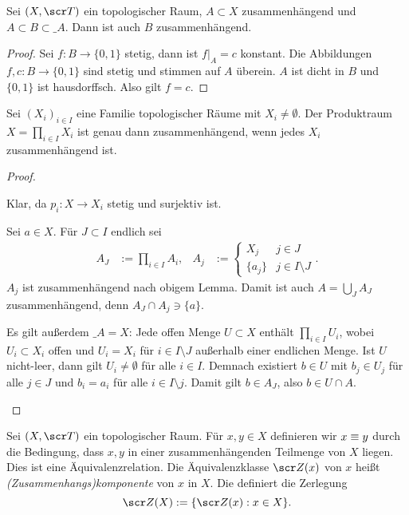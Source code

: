 \begin{lem}
	Sei $(X, \scr T)$ ein topologischer Raum, $A \subset X$ zusammenhängend und $A \subset B \subset \_A$.
	Dann ist auch $B$ zusammenhängend.
	\begin{proof}
		Sei $f: B \to \{0,1\}$ stetig, dann ist $f|_A = c$ konstant.
		Die Abbildungen $f, c: B \to \{0,1\}$ sind stetig und stimmen auf $A$ überein.
		$A$ ist dicht in $B$ und $\{0,1\}$ ist hausdorffsch.
		Also gilt $f=c$.
	\end{proof}
\end{lem}

\begin{st}
	Sei $(X_i)_{i\in I}$ eine Familie topologischer Räume mit $X_i \neq \emptyset$.
	Der Produktraum $X = \prod_{i\in I} X_i$ ist genau dann zusammenhängend, wenn jedes $X_i$ zusammenhängend ist.
	\begin{proof}
		\begin{segnb}[„$\implies$“]
			Klar, da $p_i: X \to X_i$ stetig und surjektiv ist.
		\end{segnb}
		\begin{segnb}[„$\implies$“]
			Sei $a \in X$.
			Für $J \subset I$ endlich sei
			\begin{align*}
				A_J &:= \prod_{i\in I} A_i, &
				A_j &:= \begin{cases}
					X_j & j \in J \\
					\{a_j\} & j \in I \setminus J
				\end{cases}.
			\end{align*}
			$A_j$ ist zusammenhängend nach obigem Lemma.
			Damit ist auch $A = \bigcup_{J} A_J$ zusammenhängend, denn $A_J \cap A_j \ni \{a\}$.

			Es gilt außerdem $\_A = X$:
			Jede offen Menge $U \subset X$ enthält $\prod_{i \in I} U_i$, wobei $U_i \subset X_i$ offen und $U_i = X_i$ für $i \in I \setminus J$ außerhalb einer endlichen Menge.
			Ist $U$ nicht-leer, dann gilt $U_i \neq \emptyset$ für alle $i \in I$.
			Demnach existiert $b \in U$ mit $b_j \in U_j$ für alle $j \in J$ und $b_i = a_i$ für alle $i \in I \setminus j$.
			Damit gilt $b \in A_J$, also $b \in U \cap A$.
		\end{segnb}
	\end{proof}
\end{st}

\begin{df}
	Sei $(X, \scr T)$ ein topologischer Raum.
	Für $x,y \in X$ definieren wir $x \equiv y$ durch die Bedingung, dass $x,y$ in einer zusammenhängenden Teilmenge von $X$ liegen.
	Dies ist eine Äquivalenzrelation.
	Die Äquivalenzklasse $\scr Z(x)$ von $x$ heißt \emph{(Zusammenhangs)komponente} von $x$ in $X$.
	Die definiert die Zerlegung
	\[
		\scr Z(X) := \{ \scr Z(x) : x \in X \}.
	\]
\end{df}

